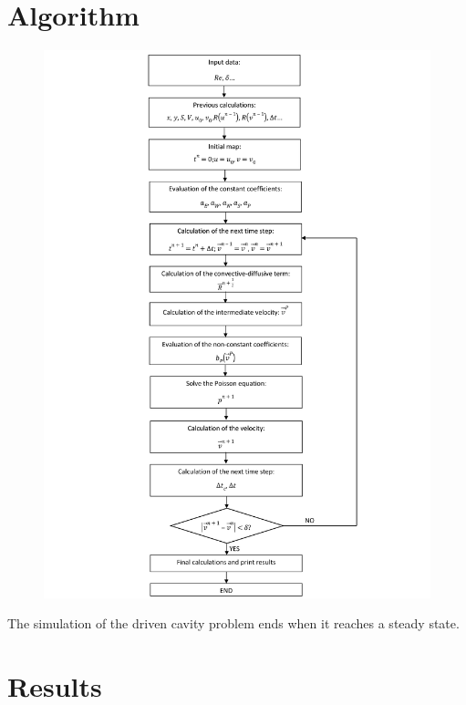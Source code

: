 \section{Algorithm}
\begin{figure}[H]
	\centering
	\includegraphics[scale=0.169]{DrivenCavity/algorithm}
\end{figure}
The simulation of the driven cavity problem ends when it reaches a steady state.

\section{Results}

